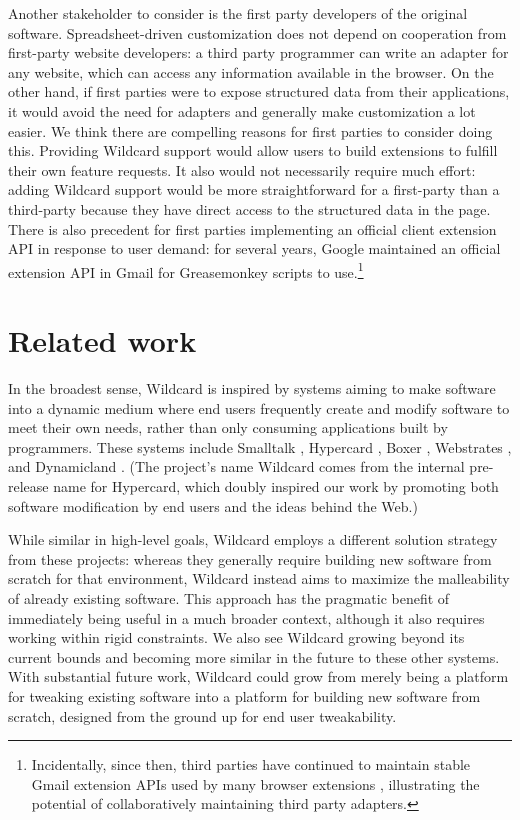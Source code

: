 \documentclass[english,submission]{programming}
\begin{document}
Another stakeholder to consider is the first party developers of the
original software. Spreadsheet-driven customization does not depend on
cooperation from first-party website developers: a third party
programmer can write an adapter for any website, which can access any
information available in the browser. On the other hand, if first
parties were to expose structured data from their applications, it would
avoid the need for adapters and generally make customization a lot
easier. We think there are compelling reasons for first parties to
consider doing this. Providing Wildcard support would allow users to
build extensions to fulfill their own feature requests. It also would
not necessarily require much effort: adding Wildcard support would be
more straightforward for a first-party than a third-party because they
have direct access to the structured data in the page. There is also
precedent for first parties implementing an official client extension
API in response to user demand: for several years, Google maintained an
official extension API in Gmail for Greasemonkey scripts to
use.\footnote{Incidentally, since then, third parties have continued to
  maintain stable Gmail extension APIs used by many browser extensions
  \autocite{streak,talwar2019}, illustrating the potential of
  collaboratively maintaining third party adapters.}

\hypertarget{related-work}{%
\section{Related work}\label{related-work}}

In the broadest sense, Wildcard is inspired by systems aiming to make
software into a dynamic medium where end users frequently create and
modify software to meet their own needs, rather than only consuming
applications built by programmers. These systems include Smalltalk
\autocite{kay1977}, Hypercard \autocite{hypercard2019}, Boxer
\autocite{disessa1986}, Webstrates \autocite{klokmose2015}, and
Dynamicland \autocite{victor}. (The project's name Wildcard comes from
the internal pre-release name for Hypercard, which doubly inspired our
work by promoting both software modification by end users and the ideas
behind the Web.)

While similar in high-level goals, Wildcard employs a different solution
strategy from these projects: whereas they generally require building
new software from scratch for that environment, Wildcard instead aims to
maximize the malleability of already existing software. This approach
has the pragmatic benefit of immediately being useful in a much broader
context, although it also requires working within rigid constraints. We
also see Wildcard growing beyond its current bounds and becoming more
similar in the future to these other systems. With substantial future
work, Wildcard could grow from merely being a platform for tweaking
existing software into a platform for building new software from
scratch, designed from the ground up for end user tweakability.
\end{document}
